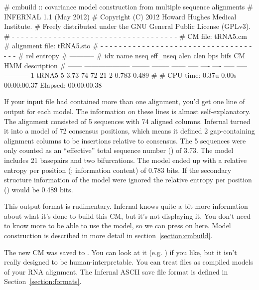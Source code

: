 \begin{sreoutput}
# cmbuild :: covariance model construction from multiple sequence alignments
# INFERNAL 1.1 (May 2012)
# Copyright (C) 2012 Howard Hughes Medical Institute.
# Freely distributed under the GNU General Public License (GPLv3).
# - - - - - - - - - - - - - - - - - - - - - - - - - - - - - - - - - - - -
# CM file:                                            tRNA5.cm
# alignment file:                                     tRNA5.sto
# - - - - - - - - - - - - - - - - - - - - - - - - - - - - - - - - - - - -
#                                                                      rel entropy
#                                                                      -----------
# idx    name                     nseq eff_nseq   alen  clen  bps bifs    CM   HMM description
# ------ -------------------- -------- -------- ------ ----- ---- ---- ----- ----- -----------
       1 tRNA5                       5     3.73     74    72   21    2 0.783 0.489 
#
# CPU time: 0.37u 0.00s 00:00:00.37 Elapsed: 00:00:00.38
\end{sreoutput}

If your input file had contained more than one alignment, you'd get
one line of output for each model. The information on these lines is
almost self-explanatory. The  alignment consisted of 5
sequences with 74 aligned columns. Infernal turned it into a model of
72 consensus positions, which means it defined 2 gap-containing
alignment columns to be insertions relative to consensus. The 5
sequences were only counted as an ``effective'' total sequence number
() of 3.73. The model includes 21 basepairs and two
bifurcations. The model ended up with a relative entropy per position
(; information content) of 0.783 bits. If the
secondary structure information of the model were ignored the relative
entropy per position () would be 0.489 bits.

This output format is rudimentary. Infernal knows quite a bit more
information about what it's done to build this CM, but it's not
displaying it. You don't need to know more to be able to use the
model, so we can press on here. Model construction is described in
more detail in section~\ref{section:cmbuild}.

The new CM was saved to . You can look at it
(e.g. ) if you like, but it isn't really designed
to be human-interpretable. You can treat  files as compiled
models of your RNA alignment. The Infernal ASCII save file format is
defined in Section~\ref{section:formats}.

